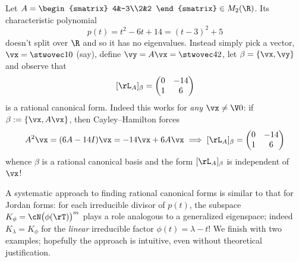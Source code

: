 \begin{example}{}{}
Let $A=\begin{smatrix}
4&-3\\2&2
\end{smatrix}\in M_2(\R)$. Its characteristic polynomial
\[p(t)=t^2-6t+14=(t-3)^2+5\]
doesn't split over $\R$ and so it has no eigenvalues. Instead simply pick a vector, $\vx=\stwovec 10$ (say), define $\vy=A\vx=\stwovec 42$, let $\beta=\{\vx,\vy\}$ and observe that
\[[\rL_A]_\beta=\begin{pmatrix}
0&-14\\1&6
\end{pmatrix}\]
is a rational canonical form. Indeed this works for \emph{any} $\vx\neq\V0$: if $\beta:=\{\vx,A\vx\}$, then Cayley--Hamilton forces
\[A^2\vx=(6A-14I)\vx=-14\vx+6A\vx\implies  [\rL_A]_\beta=\begin{pmatrix}
0&-14\\1&6
\end{pmatrix}\]
whence $\beta$ is a rational canonical basis and the form $[\rL_A]_\beta$ is independent of $\vx$!
\end{example}

A systematic approach to finding rational canonical forms is similar to that for Jordan forms: for each irreducible divisor of $p(t)$, the subspace $K_\phi=\cN\bigl(\phi(\rT)\bigr)^m$ plays a role analogous to a generalized eigenspace; indeed $K_\lambda=K_\phi$ for the \emph{linear} irreducible factor $\phi(t)=\lambda-t$!\smallbreak
We finish with two examples; hopefully the approach is intuitive, even without theoretical justification.

